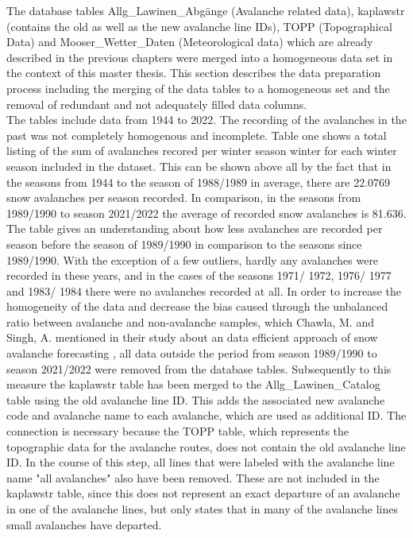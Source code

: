 \documentclass[../masterarbeit.tex]{subfiles}
\begin{document}
The database tables Allg\_Lawinen\_Abgänge (Avalanche related data), kaplawstr (contains the old as well as the new avalanche line IDs), TOPP (Topographical Data) and Mooser\_Wetter\_Daten (Meteorological data) which are already described in the previous chapters were merged into a homogeneous data set in the context of this master thesis. This section describes the data preparation process including the merging of the data tables to a homogeneous set and the removal of redundant and not adequately filled data columns. \\
The tables include data from 1944 to 2022. The recording of the avalanches in the past was not completely homogenous and incomplete. Table one shows a total listing of the sum of avalanches recored per winter season winter for each winter season included in the dataset. This can be shown above all by the fact that in the seasons from 1944 to the season of 1988/1989 in average, there are 22.0769 snow avalanches per season recorded. In comparison, in the seasons from 1989/1990 to season 2021/2022 the average of recorded snow avalanches is 81.636. The table gives an understanding about how less avalanches are recorded per season before the season of 1989/1990 in comparison to the seasons since 1989/1990. With the exception of a few outliers, hardly any avalanches were recorded in these years, and in the cases of the seasons 1971/ 1972, 1976/ 1977 and 1983/ 1984 there were no avalanches recorded at all. In order to increase the homogeneity of the data and decrease the bias caused through the unbalanced ratio between avalanche and non-avalanche samples, which Chawla, M. and Singh, A. mentioned in their study about an data efficient approach of snow avalanche forecasting \textcite[]{nhess-2021-106}, all data outside the period from season 1989/1990 to season 2021/2022 were removed from the database tables.
Subsequently to this measure the kaplawstr table has been merged to the Allg\_Lawinen\_Catalog table using the old avalanche line ID. This adds the associated new avalanche code and avalanche name to each avalanche, which are used as additional ID. The connection is necessary because the TOPP table, which represents the topographic data for the avalanche routes, does not contain the old avalanche line ID. In the course of this step, all lines that were labeled with the avalanche line name "all avalanches" also have been removed. These are not included in the kaplawstr table, since this does not represent an exact departure of an avalanche in one of the avalanche lines, but only states that in many of the avalanche lines small avalanches have departed. \\
\end{document}
